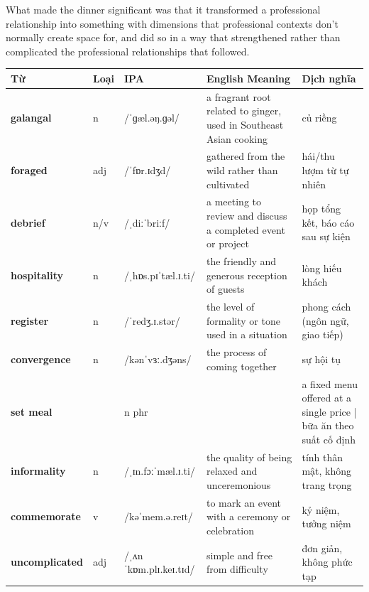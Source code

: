 \begin{ieltsanswer}
What made the dinner significant was that it transformed a professional relationship into something with dimensions that professional contexts don't normally create space for, and did so in a way that strengthened rather than complicated the professional relationships that followed.
\end{ieltsanswer}


\vspace{0.8em}
\begin{center}
\renewcommand{\arraystretch}{1.65}
\begin{tabularx}{\textwidth}{|V{0.22\textwidth}|C{0.07\textwidth}|I{0.20\textwidth}|Y|V{0.18\textwidth}|}
\hline
{}
\textbf{Từ} & \textbf{Loại} & \textbf{IPA} & \textbf{English Meaning} & \textbf{Dịch nghĩa} \\
\hline
\textbf{galangal} & n & /ˈɡæl.əŋ.ɡəl/ & a fragrant root related to ginger, used in Southeast Asian cooking & củ riềng \\ \hline
\textbf{foraged} & adj & /ˈfɒr.ɪdʒd/ & gathered from the wild rather than cultivated & hái/thu lượm từ tự nhiên \\ \hline
\textbf{debrief} & n/v & /ˌdiːˈbriːf/ & a meeting to review and discuss a completed event or project & họp tổng kết, báo cáo sau sự kiện \\ \hline
\textbf{hospitality} & n & /ˌhɒs.pɪˈtæl.ɪ.ti/ & the friendly and generous reception of guests & lòng hiếu khách \\ \hline
\textbf{register} & n & /ˈredʒ.ɪ.stər/ & the level of formality or tone used in a situation & phong cách (ngôn ngữ, giao tiếp) \\ \hline
\textbf{convergence} & n & /kənˈvɜː.dʒəns/ & the process of coming together & sự hội tụ \\ \hline
\textbf{set meal} & & n phr & & a fixed menu offered at a single price | bữa ăn theo suất cố định \\ \hline
\textbf{informality} & n & /ˌɪn.fɔːˈmæl.ɪ.ti/ & the quality of being relaxed and unceremonious & tính thân mật, không trang trọng \\ \hline
\textbf{commemorate} & v & /kəˈmem.ə.reɪt/ & to mark an event with a ceremony or celebration & kỷ niệm, tưởng niệm \\ \hline
\textbf{uncomplicated} & adj & /ˌʌnˈkɒm.plɪ.keɪ.tɪd/ & simple and free from difficulty & đơn giản, không phức tạp \\ \hline
\end{tabularx}
\end{center}

